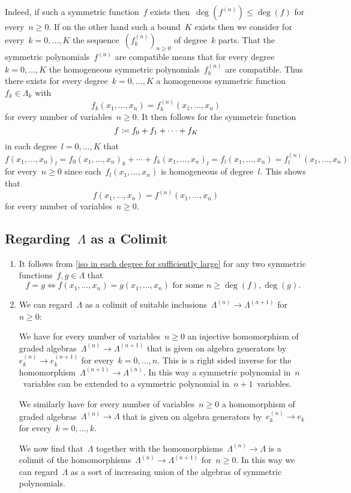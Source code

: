 \documentclass[a4paper,11pt]{scrartcl}
\begin{document}
Indeed, if such a symmetric function~$f$ exists then~$\deg( f^{(n)} ) \leq \deg(f)$ for every~$n \geq 0$.
If on the other hand such a bound~$K$ exists then we consider for every~$k = 0, \dotsc, K$ the sequence~$( f^{(n)}_k )_{n \geq 0}$ of degree~$k$ parts.
That the symmetric polynomials~$f^{(n)}$ are compatible means that for every degree~$k = 0, \dotsc, K$ the homogeneous symmetric polynomials~$f^{(n)}_k$ are compatible.
Thus there exists for every degree~$k = 0, \dotsc, K$ a homogeneous symmetric function~$f_k \in \Lambda_k$ with
\[
f_k(x_1, \dots, x_n)
=
f^{(n)}_k(x_1, \dotsc, x_n)
\]
for every number of variables~$n \geq 0$.
It then follows for the symmetric function
\[
f
\coloneqq
f_0 + f_1 + \dotsb + f_K
\]
in each degree~$l = 0, \dotsc, K$ that
\[
f(x_1, \dotsc, x_n)_l
=
f_0(x_1, \dotsc, x_n)_k
+
\dotsb
+
f_k(x_1, \dotsc, x_n)_l
=
f_l(x_1, \dotsc, x_n)
=
f^{(n)}_l(x_1, \dotsc, x_n)
\]
for every~$n \geq 0$ since each~$f_l(x_1, \dotsc, x_n)$ is homogeneous of degree~$l$.
This shows that
\[
f(x_1, \dotsc, x_n)
=
f^{(n)}(x_1, \dotsc, x_n)
\]
for every number of variables~$n \geq 0$.



\subsection{Regarding~$\Lambda$ as a Colimit}
\label{symmetric functions as colimit}

\begin{remark}
  \leavevmode
  \begin{enumerate}
    \item
      It follows from \cref{iso in each degree for sufficiently large} for any two symmetric functions~$f, g \in \Lambda$ that
      \[
        f = g
        \iff
        \text{$f(x_1, \dotsc, x_n) = g(x_1, \dotsc, x_n)$ for some~$n \geq \deg(f), \deg(g)$.}
      \]
    \item
      We can regard~$\Lambda$ as a colimit of suitable inclusions~$\Lambda^{(n)} \to \Lambda^{(n+1)}$ for~$n \geq 0$:

      We have for every number of variables~$n \geq 0$ an injective homomorphism of graded algebras~$\Lambda^{(n)} \to \Lambda^{(n+1)}$ that is given on algebra generators by~$e^{(n)}_k \to e^{(n+1)}_k$ for every~$k = 0, \dotsc, n$.
      This is a right sided inverse for the homomorphism~$\Lambda^{(n+1)} \to \Lambda^{(n)}$.
      In this way a symmetric polynomial in~$n$~variables can be extended to a symmetric polynomial in~$n+1$~variables.

      We similarly have for every number of variables~$n \geq 0$ a homomorphism of graded algebras~$\Lambda^{(n)} \to \Lambda$ that is given on algebra generators by~$e^{(n)}_k \to e_k$ for every~$k = 0, \dotsc, k$.

      We now find that~$\Lambda$ together with the homomorphisms~$\Lambda^{(n)} \to \Lambda$ is a colimit of the homomorphisms~$\Lambda^{(n)} \to \Lambda^{(n+1)}$ for~$n \geq 0$.
      In this way we can regard~$\Lambda$ as a sort of increasing union of the algebras of symmetric polynomials.
  \end{enumerate}
\end{remark}
\end{document}
